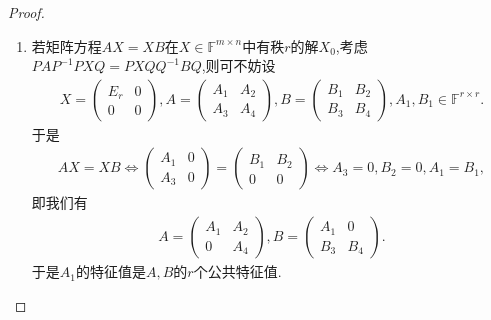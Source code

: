 \documentclass[../../main.tex]{subfiles}%
\begin{document}
\begin{proof}
\begin{enumerate}[(1)]
\item 若矩阵方程$AX = XB$在$X \in \mathbb{F}^{m \times n}$中有秩$r$的解$X_0$,考虑$PAP^{-1}PXQ=PXQQ^{-1}BQ$,则可不妨设
\begin{align*}
X = \begin{pmatrix} E_r & 0 \\ 0 & 0 \end{pmatrix}, A = \begin{pmatrix} A_1 & A_2 \\ A_3 & A_4 \end{pmatrix}, B = \begin{pmatrix} B_1 & B_2 \\ B_3 & B_4 \end{pmatrix}, A_1, B_1 \in \mathbb{F}^{r \times r}.
\end{align*}
于是
\begin{align*}
AX = XB \iff \begin{pmatrix} A_1 & 0 \\ A_3 & 0 \end{pmatrix} = \begin{pmatrix} B_1 & B_2 \\ 0 & 0 \end{pmatrix} \iff A_3 = 0, B_2 = 0, A_1 = B_1,
\end{align*}
即我们有
\begin{align*}
A = \begin{pmatrix} A_1 & A_2 \\ 0 & A_4 \end{pmatrix}, B = \begin{pmatrix} A_1 & 0 \\ B_3 & B_4 \end{pmatrix}.
\end{align*}
于是$A_1$的特征值是$A,B$的$r$个公共特征值.
\end{enumerate}
\end{proof}
\end{document}
